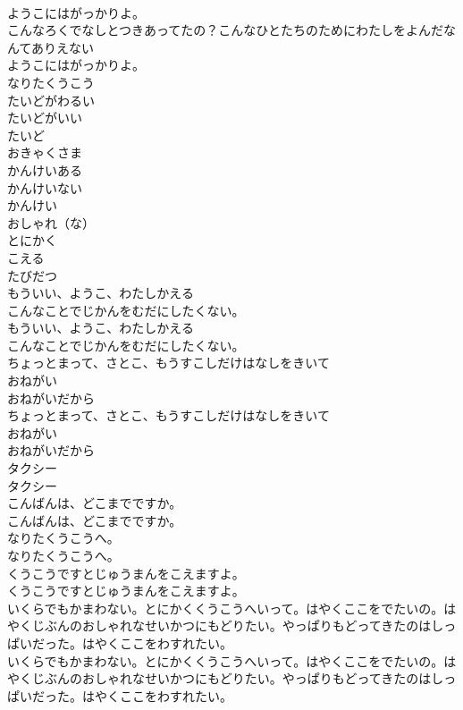 \documentclass[8pt]{extreport}
\begin{document}
\begin{CJK}{UTF8}{min}
\\	ようこにはがっかりよ。
\\	こんなろくでなしとつきあってたの？こんなひとたちのためにわたしをよんだなんてありえない
\\	ようこにはがっかりよ。
\\	なりたくうこう
\\	たいどがわるい
\\	たいどがいい
\\	たいど
\\	おきゃくさま
\\	かんけいある
\\	かんけいない
\\	かんけい
\\	おしゃれ（な）
\\	とにかく
\\	こえる
\\	たびだつ
\\	もういい、ようこ、わたしかえる
\\	こんなことでじかんをむだにしたくない。
\\	もういい、ようこ、わたしかえる
\\	こんなことでじかんをむだにしたくない。
\\	ちょっとまって、さとこ、もうすこしだけはなしをきいて
\\	おねがい
\\	おねがいだから
\\	ちょっとまって、さとこ、もうすこしだけはなしをきいて
\\	おねがい
\\	おねがいだから
\\	タクシー
\\	タクシー
\\	こんばんは、どこまでですか。
\\	こんばんは、どこまでですか。
\\	なりたくうこうへ。
\\	なりたくうこうへ。
\\	くうこうですとじゅうまんをこえますよ。
\\	くうこうですとじゅうまんをこえますよ。
\\	いくらでもかまわない。とにかくくうこうへいって。はやくここをでたいの。はやくじぶんのおしゃれなせいかつにもどりたい。やっぱりもどってきたのはしっぱいだった。はやくここをわすれたい。
\\	いくらでもかまわない。とにかくくうこうへいって。はやくここをでたいの。はやくじぶんのおしゃれなせいかつにもどりたい。やっぱりもどってきたのはしっぱいだった。はやくここをわすれたい。

\end{CJK}
\end{document}
